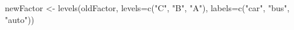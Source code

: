 \begin{Schunk}
\begin{Sinput}
  newFactor <- levels(oldFactor, levels=c("C", "B", "A"), labels=c("car", "bus", "auto"))
\end{Sinput}
\end{Schunk}
